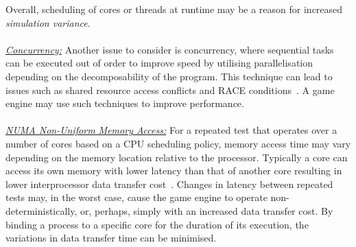 \documentclass[letterpaper, 10 pt, journal, twoside]{IEEEtran}
\begin{document}
Overall, scheduling of cores or threads at runtime may be a reason for increased \textit{simulation variance}. 
%
\\\\
\noindent\underline{\textit{Concurrency:}}
Another issue to consider is concurrency, where sequential tasks can be executed out of order to improve speed by utilising parallelisation depending on the decomposability of the program. This technique can lead to issues such as shared resource access conflicts and RACE conditions~\cite{huffman1954synthesis}. A game engine may use such techniques to improve performance.
\\\\
\noindent\underline{\textit{NUMA Non-Uniform Memory Access:}}
For a repeated test that operates over a number of cores based on a CPU scheduling policy, memory access time may vary depending on the memory location relative to the processor. Typically a core can access its own memory with lower latency than that of another core resulting in lower interprocessor data transfer cost~\cite{nieplocha1996global}. 
%
Changes in latency between repeated tests may, in the worst case, cause the game engine to operate non-deterministically, or, perhaps, simply with an increased data transfer cost. 
%
By binding a process to a specific core for the duration of its execution, the variations in data transfer time can be minimised.
\\\\
\end{document}

